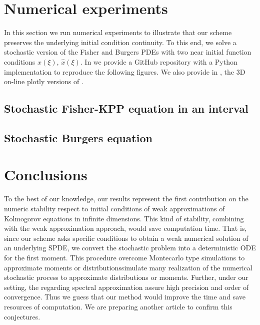 \documentclass[]{interact}
\theoremstyle{plain}%
\theoremstyle{definition}
\theoremstyle{remark}
\begin{document}
\section{Numerical experiments}
    \label{sec:NumericalExperiments}
        In this section we run numerical experiments to illustrate that our
    scheme preserves the underlying initial condition continuity. To 
    this end, we solve  a stochastic version of the  Fisher and Burgers PDEs 
    with two near initial function conditions $x(\xi)$, 
    $\widehat{x}(\xi)$. In \cite{matsumyaRepo} we provide a GitHub repository 
    with a Python implementation to reproduce the following figures. We also 
    provide in \cite{plotlyFisher, plotlyBurgers}, the 3D on-line plotly 
    versions of .
%
    \subsection*{Stochastic Fisher-KPP equation in an interval}
        
    \subsection*{Stochastic Burgers equation}
        

\section{Conclusions}
        To the best of our knowledge, our results represent the first 
    contribution on the numeric stability respect to initial conditions of weak 
    approximations of Kolmogorov equations in infinite dimensions. This kind of 
    stability, combining with the weak approximation approach, 
    would save computation time. That is, since our scheme asks specific 
    conditions to obtain a weak numerical solution of an underlying SPDE, we 
    convert the stochastic problem into a deterministic ODE for the first 
    moment. This procedure overcome Montecarlo type simulations to  approximate 
    moments or   distributions\textemdash simulate many realization of the 
    numerical stochastic process to approximate distributions or moments. 
    Further, under  our setting, the regarding spectral approximation assure 
    high precision and order of convergence. Thus we guess 
    that our method would improve the time and save resources of
    computation. We are preparing another article to confirm this 
    conjectures.


\end{document}

